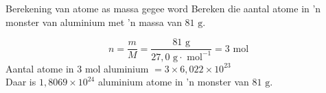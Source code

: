     \noindent
\label{m38717*secfhsst!!!underscore!!!id494}
      \noindent
      \begin{wex}{Berekening van atome as massa gegee word}{
Bereken die aantal atome in 'n monster van aluminium met 'n massa van $81 \text{ g}$.
      }
{
      \label{m38717*id277959}\nopagebreak\noindent{}
        
    \begin{equation*}
    n=\frac{m}{M}=\frac{81 \text{ g}}{27,0 \text{ g} \cdot \text{ mol}^{-1}} = 3 \text{ mol}
      \end{equation*}
      \label{m38717*id278019}Aantal atome in 3 mol aluminium $=3 \times 6,022 \times 10^{23}$ \\
      \label{m38717*id278053}Daar is $1,8069 \times 10^{24}$ aluminium atome in 'n monster van $81 \text{ g}$.
}
    \end{wex}
    \noindent
\label{m38717*secfhsst!!!underscore!!!id539}
